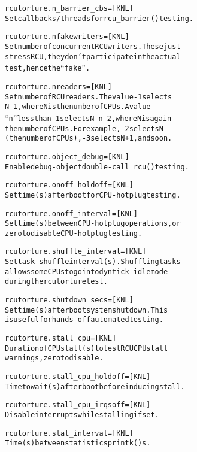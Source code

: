 \documentclass[a4paper,8pt,english]{sphinxmanual}
\begin{document}
\begin{alltt}
        rcutorture.n\_barrier\_cbs= {[}KNL{]}
                        Set callbacks/threads for rcu\_barrier() testing.

        rcutorture.nfakewriters= {[}KNL{]}
                        Set number of concurrent RCU writers.  These just
                        stress RCU, they don't participate in the actual
                        test, hence the ``fake''.

        rcutorture.nreaders= {[}KNL{]}
                        Set number of RCU readers.  The value -1 selects
                        N-1, where N is the number of CPUs.  A value
                        ``n'' less than -1 selects N-n-2, where N is again
                        the number of CPUs.  For example, -2 selects N
                        (the number of CPUs), -3 selects N+1, and so on.

        rcutorture.object\_debug= {[}KNL{]}
                        Enable debug-object double-call\_rcu() testing.

        rcutorture.onoff\_holdoff= {[}KNL{]}
                        Set time (s) after boot for CPU-hotplug testing.

        rcutorture.onoff\_interval= {[}KNL{]}
                        Set time (s) between CPU-hotplug operations, or
                        zero to disable CPU-hotplug testing.

        rcutorture.shuffle\_interval= {[}KNL{]}
                        Set task-shuffle interval (s).  Shuffling tasks
                        allows some CPUs to go into dyntick-idle mode
                        during the rcutorture test.

        rcutorture.shutdown\_secs= {[}KNL{]}
                        Set time (s) after boot system shutdown.  This
                        is useful for hands-off automated testing.

        rcutorture.stall\_cpu= {[}KNL{]}
                        Duration of CPU stall (s) to test RCU CPU stall
                        warnings, zero to disable.

        rcutorture.stall\_cpu\_holdoff= {[}KNL{]}
                        Time to wait (s) after boot before inducing stall.

        rcutorture.stall\_cpu\_irqsoff= {[}KNL{]}
                        Disable interrupts while stalling if set.

        rcutorture.stat\_interval= {[}KNL{]}
                        Time (s) between statistics printk()s.


\end{alltt}
\end{document}
